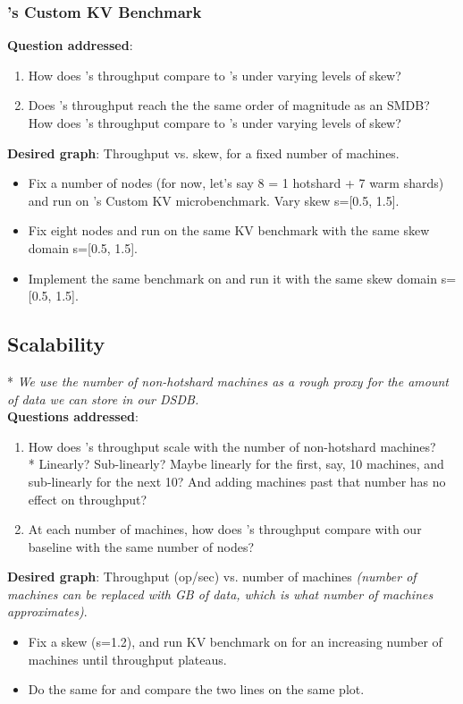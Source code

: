 \subsubsection{\dsdb{}'s Custom KV Benchmark}
\label{sec:kv}
\textbf{Question addressed}:
\begin{enumerate}
    \item How does \name{}'s throughput compare to \dsdb{}'s under varying levels of skew?
    \item Does \name{}'s throughput reach the the same order of magnitude as an SMDB? How does \name{}'s throughput compare to \smdb{}'s under varying levels of skew?
\end{enumerate}
\textbf{Desired graph}: Throughput vs. skew, for a fixed number of machines.
\begin{itemize}
    \item Fix a number of nodes (for now, let's say 8 = 1 hotshard + 7 warm shards) and run \name{} on \dsdb{}'s Custom KV microbenchmark. Vary skew s=[0.5, 1.5].
    \item Fix eight nodes and run \dsdb{} on the same KV benchmark with the same skew domain s=[0.5, 1.5].
    \item Implement the same benchmark on \smdb{} and run it with the same skew domain s=[0.5, 1.5].
\end{itemize}

\subsection{Scalability}
\label{sec:scale}

* \textit{We use the number of non-hotshard machines as a rough proxy for the amount of data we can store in our DSDB.}\\

\textbf{Questions addressed}:
\begin{enumerate}
    \item How does \name{}'s throughput scale with the number of non-hotshard machines?\\
    * Linearly? Sub-linearly? Maybe linearly for the first, say, 10 machines, and sub-linearly for the next 10? And adding machines past that number has no effect on throughput?
    \item At each number of machines, how does \name{}'s throughput compare with our baseline \dsdb{} with the same number of nodes?
\end{enumerate}
\textbf{Desired graph}: Throughput (op/sec) vs. number of machines \textit{(number of machines can be replaced with GB of data, which is what number of machines approximates)}.
\begin{itemize}
    \item Fix a skew (s=1.2), and run KV benchmark on \name{} for an increasing number of machines until throughput plateaus. 
    \item Do the same for \dsdb{} and compare the two lines on the same plot.
\end{itemize}

